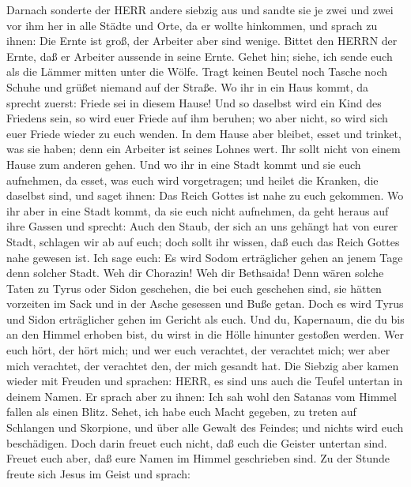  Darnach sonderte der HERR andere siebzig aus und sandte sie
je zwei und zwei vor ihm her in alle Städte und Orte, da er wollte
hinkommen,  und sprach zu ihnen: Die Ernte ist groß, der
Arbeiter aber sind wenige. Bittet den HERRN der Ernte, daß er Arbeiter
aussende in seine Ernte.  Gehet hin; siehe, ich sende euch
als die Lämmer mitten unter die Wölfe.  Tragt keinen Beutel
noch Tasche noch Schuhe und grüßet niemand auf der Straße. 
Wo ihr in ein Haus kommt, da sprecht zuerst: Friede sei in diesem Hause!
 Und so daselbst wird ein Kind des Friedens sein, so wird
euer Friede auf ihm beruhen; wo aber nicht, so wird sich euer Friede
wieder zu euch wenden.  In dem Hause aber bleibet, esset und
trinket, was sie haben; denn ein Arbeiter ist seines Lohnes wert. Ihr
sollt nicht von einem Hause zum anderen gehen.  Und wo ihr
in eine Stadt kommt und sie euch aufnehmen, da esset, was euch wird
vorgetragen;  und heilet die Kranken, die daselbst sind, und
saget ihnen: Das Reich Gottes ist nahe zu euch gekommen. 
Wo ihr aber in eine Stadt kommt, da sie euch nicht aufnehmen, da geht
heraus auf ihre Gassen und sprecht:  Auch den Staub, der
sich an uns gehängt hat von eurer Stadt, schlagen wir ab auf euch; doch
sollt ihr wissen, daß euch das Reich Gottes nahe gewesen ist.
 Ich sage euch: Es wird Sodom erträglicher gehen an jenem
Tage denn solcher Stadt.  Weh dir Chorazin! Weh dir
Bethsaida! Denn wären solche Taten zu Tyrus oder Sidon geschehen, die
bei euch geschehen sind, sie hätten vorzeiten im Sack und in der Asche
gesessen und Buße getan.  Doch es wird Tyrus und Sidon
erträglicher gehen im Gericht als euch.  Und du, Kapernaum,
die du bis an den Himmel erhoben bist, du wirst in die Hölle hinunter
gestoßen werden.  Wer euch hört, der hört mich; und wer
euch verachtet, der verachtet mich; wer aber mich verachtet, der
verachtet den, der mich gesandt hat.  Die Siebzig aber
kamen wieder mit Freuden und sprachen: HERR, es sind uns auch die Teufel
untertan in deinem Namen.  Er sprach aber zu ihnen: Ich sah
wohl den Satanas vom Himmel fallen als einen Blitz.  Sehet,
ich habe euch Macht gegeben, zu treten auf Schlangen und Skorpione, und
über alle Gewalt des Feindes; und nichts wird euch beschädigen.
 Doch darin freuet euch nicht, daß euch die Geister
untertan sind. Freuet euch aber, daß eure Namen im Himmel geschrieben
sind.  Zu der Stunde freute sich Jesus im Geist und sprach:
